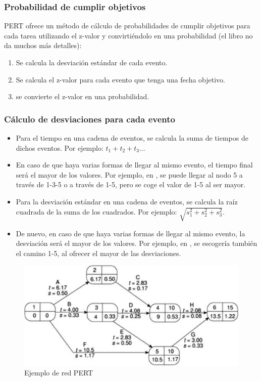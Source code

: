 \documentclass[12pt]{article}
\begin{document}
\subsubsection{Probabilidad de cumplir objetivos}
\label{7.10.4}

{PERT ofrece un método de cálculo de probabilidades de cumplir objetivos para cada tarea utilizando el z-valor y convirtiéndolo en una probabilidad (el libro no da muchos más detalles):}

\begin{enumerate}
    \item Se calcula la desviación estándar de cada evento.
    \item Se calcula el z-valor para cada evento que tenga una fecha objetivo.
    \item se convierte el z-valor en una probabilidad.
\end{enumerate}

\subsubsection{Cálculo de desviaciones para cada evento}
\label{7.10.5}

\begin{itemize}
    \item {Para el tiempo en una cadena de eventos, se calcula la suma de tiempos de dichos eventos. Por ejemplo: $t_1 + t_2 + t_3$...}
    \item {En caso de que haya varias formas de llegar al mismo evento, el tiempo final será el mayor de los valores. Por ejemplo, en , se puede llegar al nodo 5 a través de 1-3-5 o a través de 1-5, pero se coge el valor de 1-5 al ser mayor.}
    \item {Para la desviación estándar en una cadena de eventos, se calcula la raíz cuadrada de la suma de los cuadrados. Por ejemplo: $\sqrt{s_1^2 + s_2^2 + s_3^2}$.}
    \item {De nuevo, en caso de que haya varias formas de llegar al mismo evento, la desviación será el mayor de los valores. Por ejemplo, en , se escogería también el camino 1-5, al ofrecer el mayor de las desviaciones.}
\end{itemize}

\begin{figure} [ht]
    \centering
    \includegraphics[keepaspectratio=true, scale=0.80]{images/Red_PERT.jpg}
    \caption{Ejemplo de red PERT}
    \label{fig:7.3}
\end{figure}
\end{document}
